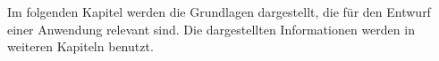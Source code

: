 Im folgenden Kapitel werden die Grundlagen dargestellt, die für den Entwurf einer Anwendung relevant sind.
Die dargestellten Informationen werden in weiteren Kapiteln benutzt.